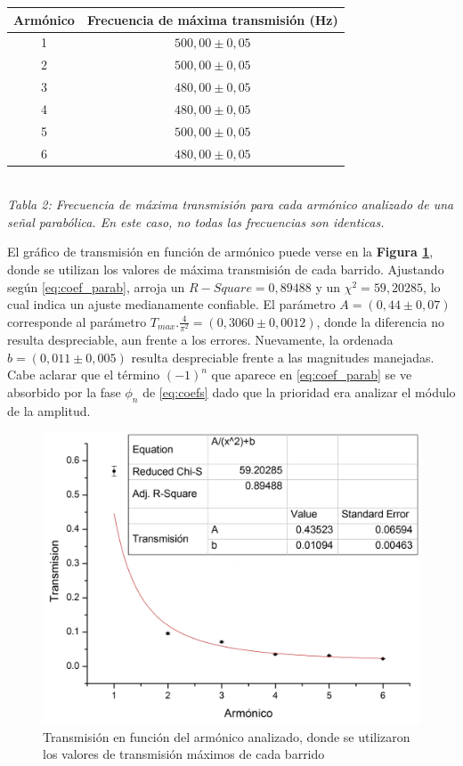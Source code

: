 \documentclass[11pt,a4paper]{article}
\begin{document}
\begin{center}
\begin{tabular}{||c|c||}
\hline 
\textbf{Armónico} & \textbf{Frecuencia de máxima transmisión (Hz)} \\ \hline 
 1 & $500,00 \pm 0,05$ \\ \hline 
 2 & $500,00 \pm 0,05$ \\ \hline 
 3 & $480,00 \pm 0,05$ \\ \hline 
 4 & $480,00 \pm 0,05$ \\ \hline 
 5 & $500,00 \pm 0,05$ \\ \hline 
 6 & $480,00 \pm 0,05$ \\ \hline 
\end{tabular}\\[0.3cm]
\textit{Tabla 2: Frecuencia de máxima transmisión para cada armónico analizado de una señal parabólica. En este caso, no todas las frecuencias son identicas.}
\end{center}

El gráfico de transmisión en función de armónico puede verse en la \textbf{Figura \ref{fig:transparab}}, donde se utilizan los valores de máxima transmisión de cada barrido. Ajustando según \eqref{eq:coef_parab}, arroja un $R-Square = 0,89488$ y un $\chi^2 = 59,20285$, lo cual indica un ajuste medianamente confiable. El parámetro $A = (0,44 \pm 0,07)$ corresponde al parámetro $T_{max}.\frac{4}{\pi^2} = (0,3060 \pm 0,0012)$, donde la diferencia no resulta despreciable, aun frente a los errores. Nuevamente, la ordenada $b = (0,011 \pm 0,005)$ resulta despreciable frente a las magnitudes manejadas. Cabe aclarar que el término $(-1)^n$ que aparece en \eqref{eq:coef_parab} se ve absorbido por la fase $\phi_n$ de \eqref{eq:coefs} dado que la prioridad era analizar el módulo de la amplitud.

\begin{figure}[h]
\centering
\includegraphics[scale=0.4]{Trans_vs_Arm_Parab}
\caption{Transmisión en función del armónico analizado, donde se utilizaron los valores de transmisión máximos de cada barrido}
\label{fig:transparab}
\end{figure}
\end{document}
